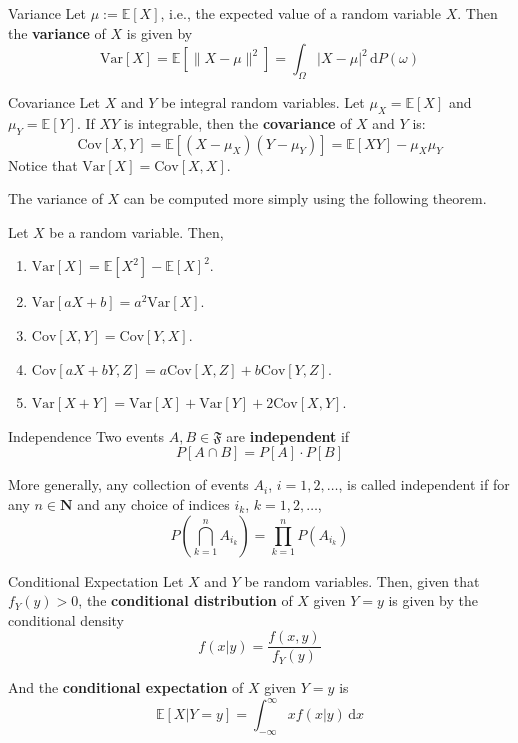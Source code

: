 \begin{definition}[]{Variance}{}
	Let $\mu := \mathbb{E}[X]$, i.e., the expected value of a random variable $X$. Then the \textbf{variance} of $X$ is given by
	\[
		\text{Var}[X] = \mathbb{E}[\|X - \mu\|^2] = \int_{\Omega} |X - \mu|^2 \, \mathrm{d} P(\omega)
	\]
\end{definition}

\begin{definition}[]{Covariance}{}
	Let $X$ and $Y$ be integral random variables. Let $\mu_X = \mathbb{E}[X]$ and $\mu_Y = \mathbb{E}[Y]$. If $XY$ is integrable, then the \textbf{covariance} of $X$ and $Y$ is:
	\[
		\text{Cov}[X,Y] = \mathbb{E}[(X-\mu_X)(Y-\mu_Y)] = \mathbb{E}[XY]-\mu_X \mu_Y
	\]
	Notice that $\text{Var}[X] = \text{Cov}[X,X]$.
\end{definition}

The variance of $X$ can be computed more simply using the following theorem.

\begin{theorem}[]{}{}
	Let $X$ be a random variable. Then,
	\begin{enumerate}
		\item $\text{Var}[X] = \mathbb{E}[X^2] - \mathbb{E}[X]^2$.
		\item $\text{Var}[aX+b] = a^2 \text{Var}[X]$.
		\item $\text{Cov}[X,Y] = \text{Cov}[Y,X]$.
		\item $\text{Cov}[aX+bY,Z] = a \text{Cov}[X,Z] + b \text{Cov}[Y,Z]$.
		\item $\text{Var}[X+Y] = \text{Var}[X] + \text{Var}[Y] + 2 \text{Cov}[X,Y]$.
	\end{enumerate}		
\end{theorem}

\begin{definition}[]{Independence}{}
	Two events $A, B \in \mathfrak{F}$ are \textbf{independent} if
	\[
		P[A \cap B] = P[A]\cdot P[B]
	\]
	
	More generally, any collection of events $A_i$, $i = 1,2,\ldots$, is called independent if for any $n \in \textbf{N}$ and any choice of indices $i_k$, $k = 1, 2, \ldots$, 
	\[
		P \left( \bigcap_{k=1}^n A_{i_k} \right) = \prod_{k=1}^n P\left( A_{i_k} \right)
	\]
\end{definition}

\begin{definition}[]{Conditional Expectation}{}
	Let $X$ and $Y$ be random variables. Then, given that $f_Y(y) > 0$, the \textbf{conditional distribution} of $X$ given $Y=y$ is given by the conditional density
	\[
		f(x|y) = \frac{f(x,y)}{f_Y(y)}
	\]
	
	And the \textbf{conditional expectation} of $X$ given $Y=y$ is
	\[
		\mathbb{E} [X| Y = y] = \int_{-\infty}^\infty x f(x|y) \, \mathrm{d}x
	\]
\end{definition}

